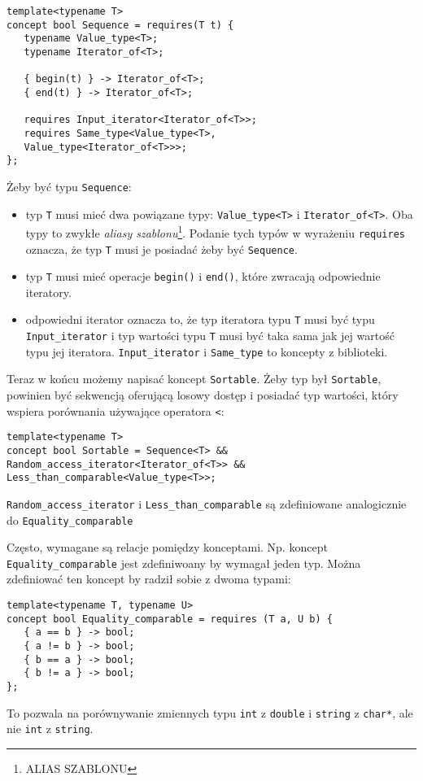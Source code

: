 \documentclass[11pt, a4paper]{article}
\begin{document}
\begin{lstlisting}[frame=single]
template<typename T>
concept bool Sequence = requires(T t) {
   typename Value_type<T>;
   typename Iterator_of<T>;
   
   { begin(t) } -> Iterator_of<T>;
   { end(t) } -> Iterator_of<T>;
   
   requires Input_iterator<Iterator_of<T>>;
   requires Same_type<Value_type<T>,
   Value_type<Iterator_of<T>>>;
};

\end{lstlisting}

Żeby być typu \verb#Sequence#:

\begin{itemize}

\item typ \verb#T# musi mieć dwa powiązane typy: \verb#Value_type<T># i \verb#Iterator_of<T>#. Oba typy to zwykłe \emph{aliasy szablonu}\footnote{ALIAS SZABLONU}. Podanie tych typów w wyrażeniu \verb#requires# oznacza, że typ \verb#T# musi je posiadać żeby być \verb#Sequence#.

\item typ \verb#T# musi mieć operacje \verb#begin()# i \verb#end()#, które zwracają odpowiednie iteratory.

\item odpowiedni iterator oznacza to, że typ iteratora typu \verb#T# musi być typu \verb#Input_iterator# i typ wartości typu \verb#T# musi być taka sama jak jej wartość typu jej iteratora. \verb#Input_iterator# i \verb#Same_type# to koncepty z biblioteki.

\end{itemize}

Teraz w końcu możemy napisać koncept \verb#Sortable#. Żeby typ był \verb#Sortable#, powinien być sekwencją oferującą losowy dostęp i posiadać typ wartości, który wspiera porównania używające operatora \verb#<#:

\begin{lstlisting}[frame=single]
template<typename T>
concept bool Sortable = Sequence<T> &&
Random_access_iterator<Iterator_of<T>> &&
Less_than_comparable<Value_type<T>>;
\end{lstlisting}

\verb#Random_access_iterator# i \verb#Less_than_comparable# są zdefiniowane analogicznie do \verb#Equality_comparable#

Często, wymagane są relacje pomiędzy konceptami. Np. koncept \verb#Equality_comparable# jest zdefiniwoany by wymagał jeden typ. Można zdefiniować ten koncept by radził sobie z dwoma typami:

\begin{lstlisting}[frame=single]
template<typename T, typename U>
concept bool Equality_comparable = requires (T a, U b) {
   { a == b } -> bool;
   { a != b } -> bool;
   { b == a } -> bool;
   { b != a } -> bool;
};
\end{lstlisting}

To pozwala na porównywanie zmiennych typu \verb#int# z \verb#double# i \verb#string# z \verb#char*#, ale nie \verb#int# z \verb#string#.
\end{document}
